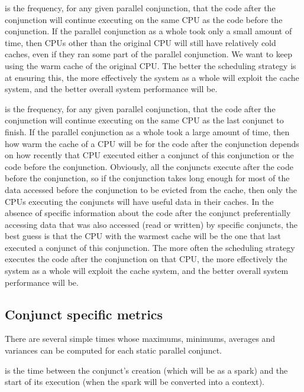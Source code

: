 is the frequency, for any given parallel conjunction,
that the code after the conjunction
will continue executing on the same CPU
as the code before the conjunction.
If the parallel conjunction as a whole took only a small amount of time,
then CPUs other than the original CPU will still have relatively cold caches,
even if they ran some part of the parallel conjunction.
We want to keep using the warm cache of the original CPU.
The better the scheduling strategy is at ensuring this,
the more effectively the system as a whole will exploit the cache system,
and the better overall system performance will be.

is the frequency, for any given parallel conjunction,
that the code after the conjunction
will continue executing on the same CPU
as the last conjunct to finish.
If the parallel conjunction as a whole took a large amount of time,
then how warm the cache of a CPU will be
for the code after the conjunction
depends on how recently that CPU executed
either a conjunct of this conjunction or the code before the conjunction.
Obviously, all the conjuncts execute after the code before the conjunction,
so if the conjunction takes long enough for most of the data accessed
before the conjunction to
be evicted from the cache,
then only the CPUs executing the conjuncts will have useful data in
their caches.
In the absence of specific information
about the code after the conjunct preferentially accessing data
that was also accessed (read or written) by specific conjuncts,
the best guess is that the CPU with the warmest cache
will be the one that last executed a conjunct of this conjunction.
The more often the scheduling strategy executes
the code after the conjunction on that CPU,
the more effectively the system as a whole will exploit the cache system,
and the better overall system performance will be.

\subsection{Conjunct specific metrics}

There are several simple times
whose maximums, minimums, averages and variances
can be computed for each static parallel conjunct.

is the time between the conjunct's creation
(which will be as a spark) and the start of its execution
(when the spark will be converted into a context).

